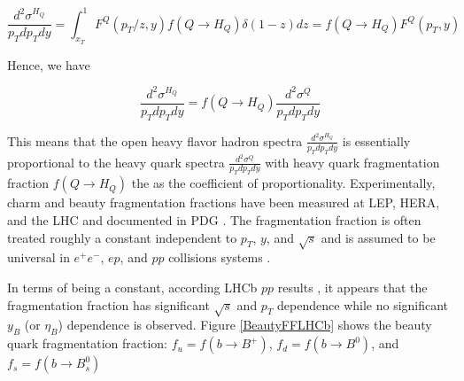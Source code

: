\begin{equation}
\frac{d^2\sigma^{H_Q}}{p_T dp_T dy}  = \int_{x_T}^1 F^Q(p_T/z, y) f(Q \rightarrow H_Q) \delta(1 - z) dz =  f(Q \rightarrow H_Q)  F^Q(p_T, y)
\end{equation}

Hence, we have 

\begin{equation}
\frac{d^2\sigma^{H_Q}}{p_T dp_T dy} = f(Q \rightarrow H_Q) \frac{d^2\sigma^{Q}}{p_T dp_T dy}
\end{equation}

This means that the open heavy flavor hadron spectra $\frac{d^2\sigma^{H_Q}}{p_T dp_T dy}$ is essentially proportional to the heavy quark spectra $\frac{d^2\sigma^{Q}}{p_T dp_T dy}$ with heavy quark fragmentation fraction $f(Q \rightarrow H_Q)$ the as the coefficient of proportionality. Experimentally, charm and beauty fragmentation fractions have been measured at LEP, HERA, and the LHC and documented in PDG \cite{AlphaTheoEx}. The fragmentation fraction is often treated roughly a constant independent to $p_T$, $y$, and $\sqrt s$ and is assumed to be universal in $e^+e^-$, $ep$, and $pp$ collisions systems \cite{AlphaTheoEx}. 

In terms of being a constant, according LHCb $pp$ results \cite{LHCbFF}, it appears that the fragmentation fraction has significant $\sqrt s$ and $p_T$ dependence while no significant $y_B$ (or $\eta_B$) dependence is observed. Figure \ref{BeautyFFLHCb} shows the beauty quark fragmentation fraction: $f_u = f(b \rightarrow B^+)$, $f_d = f(b \rightarrow B^0)$, and $f_s = f(b \rightarrow B_s^0)$

